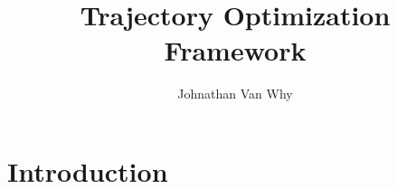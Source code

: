 \documentclass[12pt]{article}
\title{Trajectory Optimization Framework}
\author{Johnathan Van Why}
\begin{document}
	\maketitle
	\section{Introduction}
		
\end{document}
